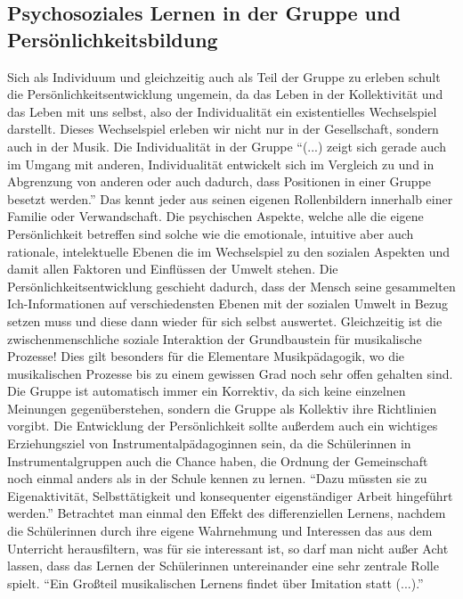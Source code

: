\subsection{Psychosoziales Lernen in der Gruppe und Persönlichkeitsbildung}
Sich als Individuum und gleichzeitig auch als Teil der Gruppe zu erleben schult
die Persönlichkeitsentwicklung ungemein, da das Leben in der Kollektivität und
das Leben mit uns selbst, also der Individualität ein existentielles
Wechselspiel darstellt. Dieses Wechselspiel erleben wir nicht nur in der
Gesellschaft, sondern auch in der Musik. Die Individualität in der Gruppe \enquote{(...)
zeigt sich gerade auch im Umgang mit anderen, Individualität entwickelt sich im
Vergleich zu und in Abgrenzung von anderen oder auch dadurch, dass Positionen in
einer Gruppe besetzt werden.}
Das kennt jeder aus seinen eigenen Rollenbildern innerhalb einer Familie oder
Verwandschaft. Die psychischen Aspekte, welche alle die eigene Persönlichkeit
betreffen sind solche wie die emotionale, intuitive aber auch rationale,
intelektuelle Ebenen die im Wechselspiel zu den sozialen Aspekten und damit
allen Faktoren und Einflüssen der Umwelt stehen. Die Persönlichkeitsentwicklung
geschieht dadurch, dass der Mensch seine gesammelten Ich-Informationen auf
verschiedensten Ebenen mit der sozialen Umwelt in Bezug setzen muss und diese
dann wieder für sich selbst auswertet. Gleichzeitig ist die zwischenmenschliche
soziale Interaktion der Grundbaustein für musikalische Prozesse!
Dies gilt besonders für die Elementare Musikpädagogik, wo die musikalischen
Prozesse bis zu einem gewissen Grad noch sehr offen gehalten sind. Die Gruppe
ist automatisch immer ein Korrektiv, da sich keine einzelnen Meinungen
gegenüberstehen, sondern die Gruppe als Kollektiv ihre Richtlinien vorgibt. Die
Entwicklung der Persönlichkeit sollte außerdem auch ein wichtiges Erziehungsziel
von Instrumentalpädagoginnen sein, da die Schülerinnen in Instrumentalgruppen auch die
Chance haben, die Ordnung der Gemeinschaft noch einmal anders als in der Schule
kennen zu lernen. \enquote{Dazu müssten sie zu Eigenaktivität, Selbsttätigkeit
und konsequenter eigenständiger Arbeit hingeführt
werden.}\autocite[64]{losert:die_kunst_zu_unterrichten} Betrachtet man einmal
den Effekt des differenziellen Lernens, nachdem die Schülerinnen durch ihre eigene
Wahrnehmung und Interessen das aus dem Unterricht herausfiltern, was für sie
interessant ist, so darf man nicht außer Acht lassen, dass das Lernen der
Schülerinnen untereinander eine sehr zentrale Rolle spielt. \enquote{Ein Großteil
musikalischen Lernens findet über Imitation statt
(...).}\autocite[98]{doerne:umfassend_musizieren}

